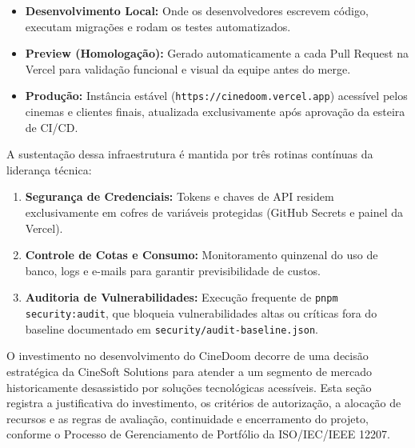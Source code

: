 \begin{itemize}
\item \textbf{Desenvolvimento Local:} Onde os desenvolvedores escrevem código, executam migrações e rodam os testes automatizados.
\item \textbf{Preview (Homologação):} Gerado automaticamente a cada Pull Request na Vercel para validação funcional e visual da equipe antes do merge.
\item \textbf{Produção:} Instância estável (\texttt{https:/\allowbreak\hspace{0pt plus 1pt}/\allowbreak\hspace{0pt plus 1pt}cinedoom.\allowbreak\hspace{0pt plus 1pt}vercel.\allowbreak\hspace{0pt plus 1pt}app}) acessível pelos cinemas e clientes finais, atualizada exclusivamente após aprovação da esteira de CI/CD.
\end{itemize}

A sustentação dessa infraestrutura é mantida por três rotinas contínuas da liderança técnica:

\begin{enumerate}
\item \textbf{Segurança de Credenciais:} Tokens e chaves de API residem exclusivamente em cofres de variáveis protegidas (GitHub Secrets e painel da Vercel).
\item \textbf{Controle de Cotas e Consumo:} Monitoramento quinzenal do uso de banco, logs e e-mails para garantir previsibilidade de custos.
\item \textbf{Auditoria de Vulnerabilidades:} Execução frequente de \texttt{pnpm \allowbreak\hspace{0pt plus 1pt}security:audit}, que bloqueia vulnerabilidades altas ou críticas fora do baseline documentado em \texttt{security/\allowbreak\hspace{0pt plus 1pt}audit-\allowbreak\hspace{0pt plus 1pt}baseline.\allowbreak\hspace{0pt plus 1pt}json}.
\end{enumerate}


O investimento no desenvolvimento do CineDoom decorre de uma decisão estratégica da CineSoft Solutions para atender a um segmento de mercado historicamente desassistido por soluções tecnológicas acessíveis. Esta seção registra a justificativa do investimento, os critérios de autorização, a alocação de recursos e as regras de avaliação, continuidade e encerramento do projeto, conforme o Processo de Gerenciamento de Portfólio da ISO/IEC/IEEE 12207.

